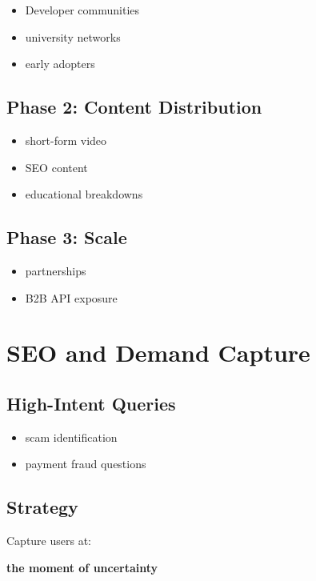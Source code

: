 \documentclass[11pt]{article}
\begin{document}
\begin{itemize}
    \item Developer communities
    \item university networks
    \item early adopters
\end{itemize}

\subsection{Phase 2: Content Distribution}

\begin{itemize}
    \item short-form video
    \item SEO content
    \item educational breakdowns
\end{itemize}

\subsection{Phase 3: Scale}

\begin{itemize}
    \item partnerships
    \item B2B API exposure
\end{itemize}

\section{SEO and Demand Capture}

\subsection{High-Intent Queries}

\begin{itemize}
    \item scam identification
    \item payment fraud questions
\end{itemize}

\subsection{Strategy}

Capture users at:
\begin{center}
\textbf{the moment of uncertainty}
\end{center}
\end{document}
